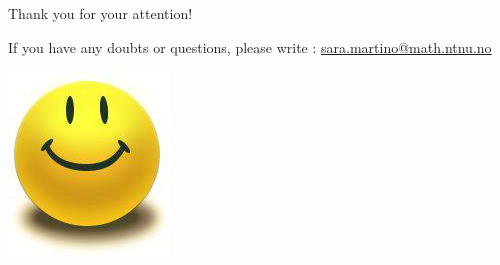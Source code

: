 \documentclass[
  ignorenonframetext,
]{beamer}
\begin{document}
\begin{frame}{}
\protect\hypertarget{section-1}{}
\Large

Thank you for your attention!

\normalsize

If you have any doubts or questions, please write :
\url{sara.martino@math.ntnu.no}

\begin{center}\includegraphics[width=0.3\linewidth]{graphics/smiley_small} \end{center}
\end{frame}
\end{document}
